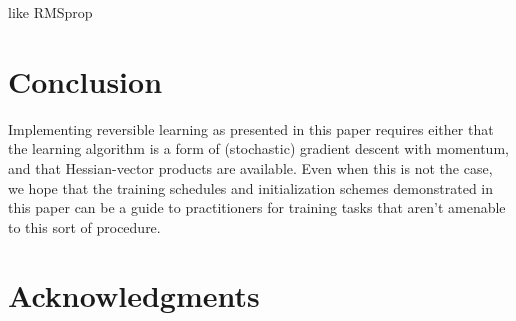 \documentclass{article}
\begin{document}
like RMSprop

\section{Conclusion}

Implementing reversible learning as presented in this paper requires either that the learning algorithm is a form of (stochastic) gradient descent with momentum, and that Hessian-vector products are available.
Even when this is not the case, we hope that the training schedules and initialization schemes demonstrated in this paper can be a guide to practitioners for training tasks that aren't amenable to this sort of procedure.

\section*{Acknowledgments} 




\end{document}
